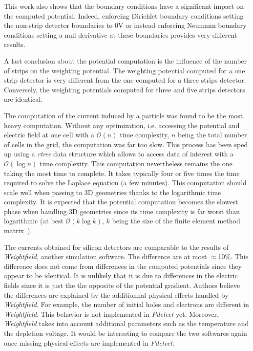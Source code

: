 \documentclass[11pt]{article}
\begin{document}
	This work also shows that the boundary conditions have a significant impact
	on the computed potential. Indeed, enforcing Dirichlet boundary conditions setting
	the non-strip detector boundaries to 0V or instead enforcing Neumann boundary
	conditions setting a null derivative at these boundaries provides very
	different results.

  A last conclusion about the potential computation is the influence of the
	number of strips on the weighting potential. The weighting potential computed
	for a one strip detector is very different from the one computed for a three
	strips detector. Conversely, the weighting potentials computed for three and five
	strips detectors are identical.

  The computation of the current induced by a particle was found to be the
	most heavy computation. Without any optimization, i.e. accessing the potential
	and electric field at one cell with a $\mathcal{O}(n)$ time complexity, $n$
	being the total number of cells in the grid,
	the computation was far too slow. This process has been sped up using a
	\textit{rtree} data structure which allows to access data of interest
	with a $\mathcal{O}( \log{n})$ time complexity. This computation nevertheless
	remains the one taking the most time to complete. It takes typically four or five
	times the time required to solve the Laplace equation (a few minutes).
	This computation should scale well when passing to 3D geometries thanks
	to the logarithmic time complexity. It is expected that the potential computation
	becomes the slowest phase when handling 3D geometries since its time complexity
	is far worst than logarithmic (at best $\mathcal{O}(k \log{k})$, $k$ being
	the size of the finite element method matrix~\cite{5165661}).

	The currents obtained for silicon
  detectors are comparable to the results of \textit{Weightfield},
  another simulation software. The difference are at most $\approx$10$\%$.
	This difference does not come from differences in the computed potentials
	since they appear to be identical. It is unlikely that it is due to differences
	in the electric fields since it is just the the opposite of the potential
	gradient. Authors believe the differences are explained by the additionnal
	physical effects handled by \textit{Weightfield}. For example, the number
	of initial holes and electrons are different in \textit{Weightfield}. This
	behavior is not implemented in \textit{Pdetect} yet. Moreover, \textit{Weightfield}
	takes into account additional parameters such as the temperature and the
	depletion voltage. It would be interesting to compare the two softwares again once
	 missing physical effects are implemented in \textit{Pdetect}.
\end{document}
